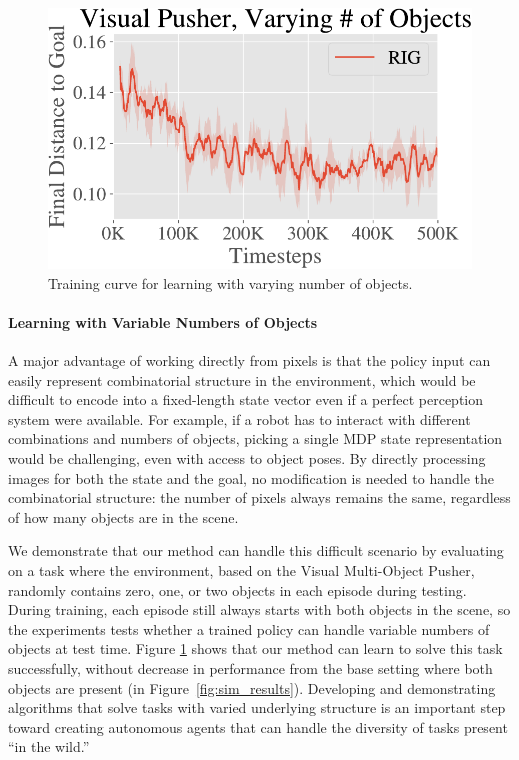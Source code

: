 \begin{figure}
    \centering
    \vspace{-0.2in}
    \includegraphics[width=\linewidth]{rig/img/pusher_vary_multiobject.pdf}
    \vspace{-0.1in}
    \captionsetup{format=plain, justification=justified}
    \caption{Training curve for learning with varying number of objects.}
    \vspace{-0.15in}
    \label{fig:multiobject}
\end{figure}

\vspace{-0.1in}
\paragraph{Learning with Variable Numbers of Objects}
A major advantage of working directly from pixels is that the policy input can easily represent combinatorial structure in the environment, which would be difficult to encode into a fixed-length state vector even if a perfect perception system were available.
For example, if a robot has to interact with different combinations and numbers of objects, picking a single MDP state representation would be challenging, even with access to object poses.
By directly processing images for both the state and the goal, no modification is needed to handle the combinatorial structure: the number of pixels always remains the same, regardless of how many objects are in the scene.

We demonstrate that our method can handle this difficult scenario by evaluating on a task where the environment, based on the Visual Multi-Object Pusher, randomly contains zero, one, or two objects in each episode during testing.
During training, each episode still always starts with both objects in the scene, so the experiments tests whether a trained policy can handle variable numbers of objects at test time.
Figure \ref{fig:multiobject} shows that our method can learn to solve this task successfully, without decrease in performance from the base setting where both objects are present (in Figure~\ref{fig:sim_results}).
Developing and demonstrating algorithms that solve tasks with varied underlying structure is an important step toward creating autonomous agents that can handle the diversity of tasks present ``in the wild.''

